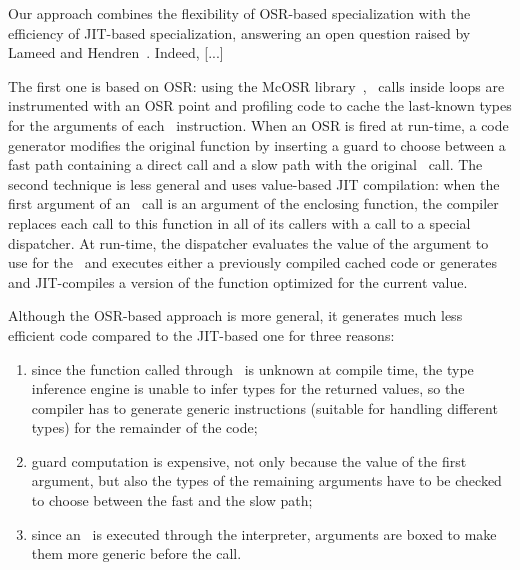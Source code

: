 \noindent Our approach combines the flexibility of OSR-based specialization with the efficiency of JIT-based specialization, answering an open question raised by Lameed and Hendren~\cite{lameed2013feval}. Indeed, [...]

\ifdefined\fullver
The first one is based on OSR: using the McOSR library~\cite{lameed2013modular}, \feval\ calls inside loops are instrumented with an OSR point and profiling code to cache the last-known types for the arguments of each \feval\ instruction. When an OSR is fired at run-time, a code generator modifies the original function by inserting a guard to choose between a fast path containing a direct call and a slow path with the original \feval\ call. The second technique is less general and uses value-based JIT compilation: when the first argument of an \feval\ call is an argument of the enclosing function, the compiler replaces each call to this function in all of its callers with a call to a special dispatcher. At run-time, the dispatcher evaluates the value of the argument to use for the \feval\ and executes either a previously compiled cached code or generates and JIT-compiles a version of the function optimized for the current value.

Although the OSR-based approach is more general, it generates much less efficient code compared to the JIT-based one for three reasons:
\begin{enumerate}
\item since the function called through \feval\ is unknown at compile time, the type inference engine is unable to infer types for the returned values, so the compiler has to generate generic instructions (suitable for handling different types) for the remainder of the code;
\item guard computation is expensive, not only because the value of the first argument, but also the types of the remaining arguments have to be checked to choose between the fast and the slow path;
\item since an \feval\ is executed through the interpreter, arguments are boxed to make them more generic before the call.
\end{enumerate}

